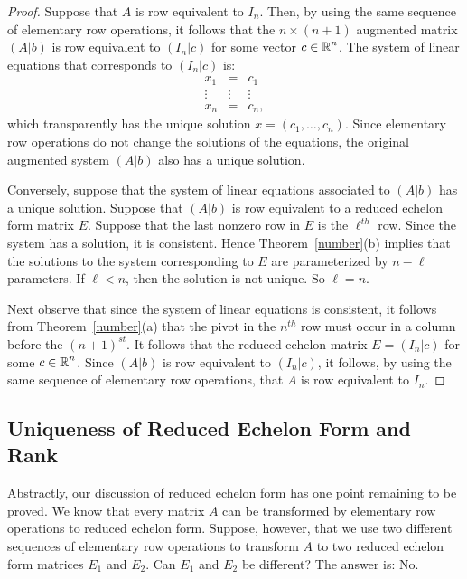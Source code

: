 \documentclass{ximera}
\begin{document}
\begin{proof}	Suppose that $A$ is row equivalent to $I_n$.  Then, by using
the same sequence of elementary row operations, it follows that
the $n\times (n+1)$ augmented matrix $(A|b)$ is row equivalent
to $(I_n|c)$ for some vector $c\in\mbox{$\mathbb{R}$}^n$.  The system of linear
equations that corresponds to $(I_n|c)$ is:
\[
\begin{array}{ccc}
x_1 & = & c_1 \\
\vdots & \vdots & \vdots \\
x_n & = & c_n,
\end{array}
\]
which transparently has the unique solution $x=(c_1,\ldots,c_n)$.
Since elementary row operations do not change the solutions of
the equations, the original augmented system $(A|b)$ also has a
unique solution.

Conversely, suppose that the system of linear equations
associated to $(A|b)$ has a unique solution.  Suppose that
$(A|b)$ is row equivalent to a reduced echelon form matrix $E$.
Suppose that the last nonzero row in $E$ is the $\ell^{th}$ row.
Since the system has a solution, it is consistent.  Hence
Theorem~\ref{number}(b) implies that the solutions to the system
corresponding to $E$ are parameterized by $n-\ell$ parameters.
If $\ell<n$, then the solution is not unique.  So $\ell=n$.

Next observe that since the system of linear equations is
consistent, it follows from Theorem~\ref{number}(a) that the
pivot in the $n^{th}$ row must occur in a column before the
$(n+1)^{st}$.  It follows that the reduced echelon matrix
$E=(I_n|c)$ for some $c\in\mbox{$\mathbb{R}$}^n$.  Since $(A|b)$ is row
equivalent to $(I_n|c)$, it follows, by using the same sequence
of elementary row operations, that $A$ is row equivalent to
$I_n$.  \end{proof}

\subsection*{Uniqueness of Reduced Echelon Form and Rank}

Abstractly, our discussion of reduced echelon form has one point
remaining to be proved.  We know that every matrix $A$ can be
transformed by elementary row operations to reduced echelon
form.  Suppose, however, that we use two different sequences of
elementary row operations to transform $A$ to two reduced
echelon form matrices $E_1$ and $E_2$.  Can $E_1$ and $E_2$ be
different?  The answer is: No.
\end{document}
